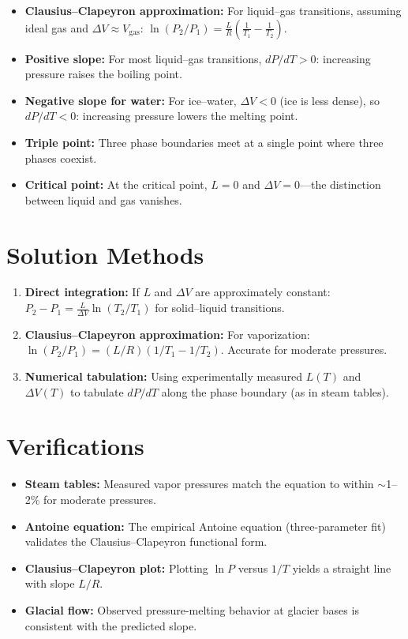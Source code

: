 \documentclass[11pt,openright]{book}
\begin{document}
\begin{itemize}
\item \textbf{Clausius--Clapeyron approximation:} For liquid--gas transitions, assuming ideal gas and $\Delta V \approx V_{\text{gas}}$: $\ln(P_2/P_1) = \frac{L}{R}\left(\frac{1}{T_1} - \frac{1}{T_2}\right)$.
\item \textbf{Positive slope:} For most liquid--gas transitions, $dP/dT > 0$: increasing pressure raises the boiling point.
\item \textbf{Negative slope for water:} For ice--water, $\Delta V < 0$ (ice is less dense), so $dP/dT < 0$: increasing pressure lowers the melting point.
\item \textbf{Triple point:} Three phase boundaries meet at a single point where three phases coexist.
\item \textbf{Critical point:} At the critical point, $L = 0$ and $\Delta V = 0$---the distinction between liquid and gas vanishes.
\end{itemize}
\section*{Solution Methods}

\begin{enumerate}
\item \textbf{Direct integration:} If $L$ and $\Delta V$ are approximately constant: $P_2 - P_1 = \frac{L}{\Delta V} \ln(T_2/T_1)$ for solid--liquid transitions.
\item \textbf{Clausius--Clapeyron approximation:} For vaporization: $\ln(P_2/P_1) = (L/R)(1/T_1 - 1/T_2)$. Accurate for moderate pressures.
\item \textbf{Numerical tabulation:} Using experimentally measured $L(T)$ and $\Delta V(T)$ to tabulate $dP/dT$ along the phase boundary (as in steam tables).
\end{enumerate}
\section*{Verifications}

\begin{itemize}
\item \textbf{Steam tables:} Measured vapor pressures match the equation to within $\sim$1--2\% for moderate pressures.
\item \textbf{Antoine equation:} The empirical Antoine equation (three-parameter fit) validates the Clausius--Clapeyron functional form.
\item \textbf{Clausius--Clapeyron plot:} Plotting $\ln P$ versus $1/T$ yields a straight line with slope $L/R$.
\item \textbf{Glacial flow:} Observed pressure-melting behavior at glacier bases is consistent with the predicted slope.
\end{itemize}
\end{document}
